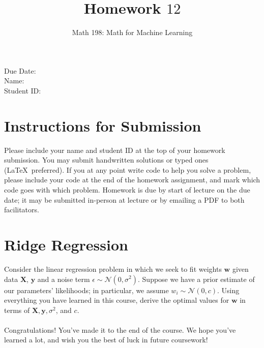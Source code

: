 \documentclass{article}
\title{Homework $12$}
\author{Math 198: Math for Machine Learning}
\date{}
\begin{document}
\maketitle

\noindent
Due Date:  \\
Name: \\
Student ID:

\section*{Instructions for Submission}
Please include your name and student ID at the top of your homework submission. You may submit handwritten solutions or typed ones (\LaTeX\ preferred). If you at any point write code to help you solve a problem, please include your code at the end of the homework assignment, and mark which code goes with which problem. Homework is due by start of lecture on the due date; it may be submitted in-person at lecture or by emailing a PDF to both facilitators.

\section{Ridge Regression}
Consider the linear regression problem in which we seek to fit weights $\mathbf{w}$ given data $\mathbf{X}$, $\mathbf{y}$ and a noise term $\epsilon \sim \mathcal{N}(0, \sigma^2)$. Suppose we have a prior estimate of our parameters' likelihoods; in particular, we assume $w_i \sim \mathcal{N}(0, c)$. Using everything you have learned in this course, derive the optimal values for $\mathbf{w}$ in terms of $\mathbf{X, y}, \sigma^2$, and $c$. \\\\

\noindent Congratulations! You've made it to the end of the course. We hope you've learned a lot, and wish you the best of luck in future coursework!
\end{document}
